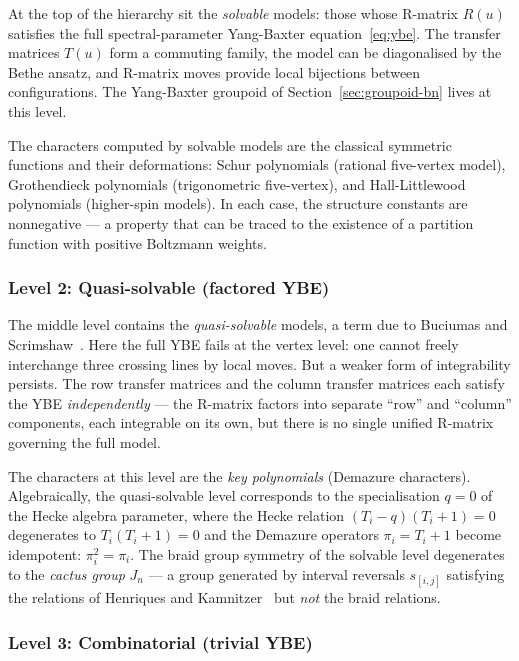 At the top of the hierarchy sit the \emph{solvable} models: those
whose R-matrix $R(u)$ satisfies the full spectral-parameter
Yang-Baxter equation~\eqref{eq:ybe}.  The transfer matrices $T(u)$
form a commuting family, the model can be diagonalised by the Bethe
ansatz, and R-matrix moves provide local bijections between
configurations.  The Yang-Baxter groupoid of
Section~\ref{sec:groupoid-bn} lives at this level.

The characters computed by solvable models are the classical symmetric
functions and their deformations: Schur polynomials (rational
five-vertex model), Grothendieck polynomials (trigonometric
five-vertex), and Hall-Littlewood polynomials (higher-spin models).
In each case, the structure constants are nonnegative --- a property
that can be traced to the existence of a partition function with
positive Boltzmann weights.

\subsubsection*{Level 2: Quasi-solvable (factored YBE)}

The middle level contains the \emph{quasi-solvable} models, a term
due to Buciumas and Scrimshaw~\cite{buciumas-scrimshaw}.  Here the
full YBE fails at the vertex level: one cannot freely interchange
three crossing lines by local moves.  But a weaker form of
integrability persists.  The row transfer matrices and the column
transfer matrices each satisfy the YBE \emph{independently} --- the
R-matrix factors into separate ``row'' and ``column'' components, each
integrable on its own, but there is no single unified R-matrix
governing the full model.

The characters at this level are the \emph{key polynomials} (Demazure
characters).  Algebraically, the quasi-solvable level corresponds to
the specialisation $q = 0$ of the Hecke algebra parameter, where the
Hecke relation $(T_i - q)(T_i + 1) = 0$ degenerates to
$T_i(T_i + 1) = 0$ and the Demazure operators
$\pi_i = T_i + 1$ become idempotent: $\pi_i^2 = \pi_i$.  The braid
group symmetry of the solvable level degenerates to the \emph{cactus
group} $J_n$ --- a group generated by interval reversals
$s_{[i,j]}$ satisfying the relations of Henriques and
Kamnitzer~\cite{henriques-kamnitzer-2006} but \emph{not} the braid
relations.

\subsubsection*{Level 3: Combinatorial (trivial YBE)}

